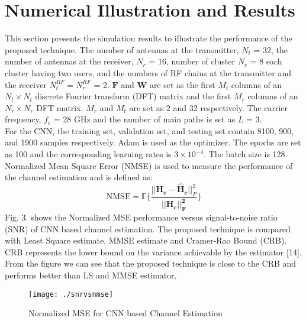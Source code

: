 \documentclass[journal]{IEEEtran}
\begin{document}
\section{Numerical Illustration and Results}
This section presents the simulation results to illustrate the performance of the proposed technique.
The number of antennas at the transmitter, $N_t$ = 32, the number of antennas at the receiver, $N_r$ = 16, number of cluster $N_c$ = 8 each cluster having two users, and the numbers of RF chains at the transmitter and the receiver $N_t^{RF} = N_r^{RF}$ = 2. $\mathbf F$ and $\mathbf W$ are set as the first $M_t$ columns of an $N_t \times N_t$ discrete Fourier transform (DFT) matrix and the first $M_r$ columns of an $N_r \times N_r$ DFT matrix. $M_r$ and $M_t$ are set as 2 and 32 respectively. The carrier frequency, $f_c$ = 28 GHz and the number of main paths is set as $L$ = 3. \\
For the CNN, the training set, validation set, and testing set contain 8100, 900, and 1900 samples respectively. Adam is used as the optimizer. The epochs are set as 100 and the corresponding learning rates is $3\times 10^{-4}$. The batch size is 128.\\
Normalized Mean Square Error (NMSE) is used to measure the performance of the channel estimation and is defined as:
\begin{equation}
\text{NMSE} = \mathbb E \Big\{\frac{\mathbf{||H_{c} - \hat{H}_{c}}||^2_F}{\mathbf{||H_{c}||^2_F}}\Big\}
\end{equation}
Fig. 3. shows the Normalized MSE performance versus signal-to-noise ratio (SNR) of CNN based channel estimation. The proposed technique is compared with Least Square estimate, MMSE estimate  and Cramer-Rao Bound (CRB). CRB represents the lower bound on the variance achievable by the estimator [14]. From the figure we can see that the proposed technique is close to the CRB and performs better than LS and MMSE estimator.
\begin{figure}[h]
	\centering
	\texttt{[image: ./snrvsnmse]} 
	\caption{Normalized MSE for CNN based Channel Estimation}
\end{figure}\\
\end{document}
